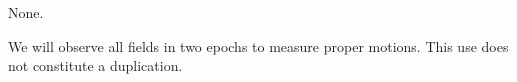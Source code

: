 \documentclass[12pt]{article}
\begin{document}

%
%
\coordinatedobs          %
None.


%
%
\duplications           %
We will observe all fields in two epochs to measure proper motions.
This use does not constitute a duplication.


\end{document}
